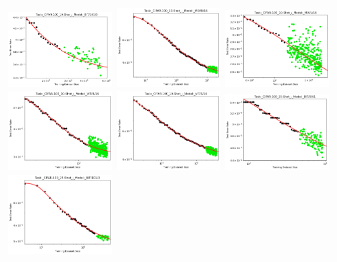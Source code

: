 \documentclass{article} %
\begin{document}
\begin{figure}
\includegraphics[width=0.245\textwidth]{figures/scaling_laws_benchmark_dataset_plots/c100_10___BiT_101_3.png}
\includegraphics[width=0.245\textwidth]{figures/scaling_laws_benchmark_dataset_plots/c100_10___MiX_B_16.png}
\includegraphics[width=0.245\textwidth]{figures/scaling_laws_benchmark_dataset_plots/c100_10___MiX_L_16.png}
\includegraphics[width=0.245\textwidth]{figures/scaling_laws_benchmark_dataset_plots/c100_10___ViT_B_16.png}
\includegraphics[width=0.245\textwidth]{figures/scaling_laws_benchmark_dataset_plots/c100_10___ViT_S_16.png}
\includegraphics[width=0.245\textwidth]{figures/scaling_laws_benchmark_dataset_plots/c100_25___BiT_50_1.png}
\includegraphics[width=0.245\textwidth]{figures/scaling_laws_benchmark_dataset_plots/c100_25___BiT_101_3.png}

\end{figure}
\end{document}
